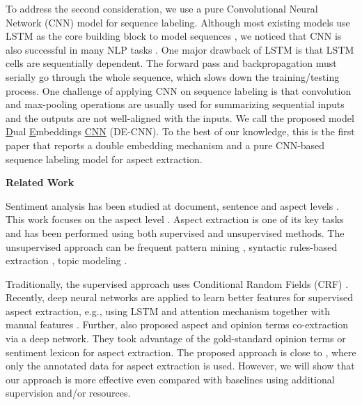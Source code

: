 To address the second consideration, we use a pure Convolutional Neural Network (CNN) \cite{lecun1995convolutional} model for sequence labeling.
Although most existing models use LSTM \cite{hochreiter1997long} as the core building block to model sequences \cite{liu2015fine,li2017deep}, we noticed that CNN is also successful in many NLP tasks \cite{kim2014convolutional,zhang2015character,gehring2017convolutional}.
One major drawback of LSTM is that LSTM cells are sequentially dependent.
The forward pass and backpropagation must serially go through the whole sequence, which slows down the training/testing process.
One challenge of applying CNN on sequence labeling is that convolution and max-pooling operations are usually used for summarizing sequential inputs and the outputs are not well-aligned with the inputs. %
We call the proposed model \underline{D}ual \underline{E}mbeddings \underline{CNN} (DE-CNN).
To the best of our knowledge, this is the first paper that reports a double embedding mechanism and a pure CNN-based sequence labeling model for aspect extraction.

\textbf{Related Work}

Sentiment analysis has been studied at document, sentence and aspect levels \cite{Liu2012,Pang2008OMS,Cambria2012}. This work focuses on the aspect level \cite{HuL2004}. Aspect extraction is one of its key tasks and has been performed using both supervised and unsupervised methods. 
The unsupervised approach can be frequent pattern mining \cite{HuL2004,PopescuNE2005}, syntactic rules-based extraction \cite{ZhuangJZ2006,WangBo2008,QiuLBC2011}, topic modeling \cite{MeiLWSZ2007,TitovM2008,Lin2009,Moghaddam2011}.

Traditionally, the supervised approach \cite{Jakob2010,Mitchell-EtAl:2013:EMNLP,shu2017lifelong} uses Conditional Random Fields (CRF) \cite{Lafferty2001conditional}.
Recently, deep neural networks are applied to learn better features for supervised aspect extraction, e.g., using
LSTM \cite{williams1989learning,hochreiter1997long,liu2015fine} and
attention mechanism \cite{wang2017coupled,he2017unsupervised} together with manual features \cite{poria2016aspect,wang2016recursive}.
Further, \cite{wang2016recursive,wang2017coupled,li2017deep} also proposed aspect and opinion terms co-extraction via a deep network.
They took advantage of the gold-standard opinion terms or sentiment lexicon for aspect extraction.
The proposed approach is close to \cite{liu2015fine}, where only the annotated data for aspect extraction is used. 
However, we will show that our approach is more effective even compared with baselines using additional supervision and/or resources.

